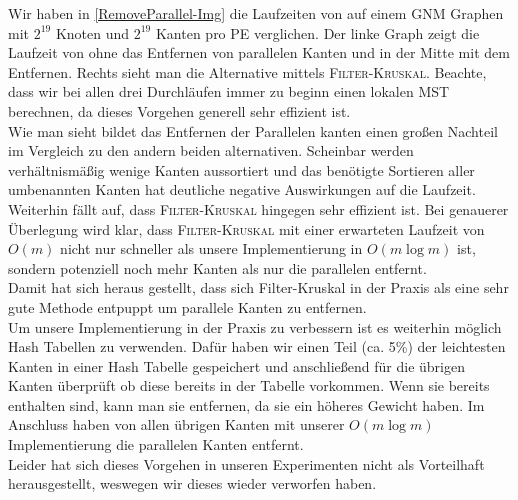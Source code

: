Wir haben in \cref{RemoveParallel-Img} die Laufzeiten von \boruvkaAllreduce auf einem GNM Graphen mit $2^{19}$ Knoten und $2^{19}$ Kanten pro PE verglichen. Der linke Graph zeigt die Laufzeit von \boruvkaAllreduce ohne das Entfernen von parallelen Kanten und in der Mitte mit dem Entfernen. Rechts sieht man die Alternative mittels \textsc{Filter-Kruskal}. Beachte, dass wir bei allen drei Durchläufen immer zu beginn einen lokalen MST berechnen, da dieses Vorgehen generell sehr effizient ist.\\
Wie man sieht bildet das Entfernen der Parallelen kanten einen großen Nachteil im Vergleich zu den andern beiden alternativen. Scheinbar werden verhältnismäßig wenige Kanten aussortiert und das benötigte Sortieren aller umbenannten Kanten hat deutliche negative Auswirkungen auf die Laufzeit.\\
Weiterhin fällt auf, dass \textsc{Filter-Kruskal} hingegen sehr effizient ist. Bei genauerer Überlegung wird klar, dass \textsc{Filter-Kruskal} mit einer erwarteten Laufzeit von $O(m)$ nicht nur schneller als unsere Implementierung in $O(m \log m)$ ist, sondern potenziell noch mehr Kanten als nur die parallelen entfernt. \\
Damit hat sich heraus gestellt, dass sich Filter-Kruskal in der Praxis als eine sehr gute Methode entpuppt um parallele Kanten zu entfernen.\\
Um unsere Implementierung in der Praxis zu verbessern ist es weiterhin möglich Hash Tabellen zu verwenden. Dafür haben wir einen Teil (ca. 5\%) der leichtesten Kanten in einer Hash Tabelle gespeichert und anschließend für die übrigen Kanten überprüft ob diese bereits in der Tabelle vorkommen. Wenn sie bereits enthalten sind, kann man sie entfernen, da sie ein höheres Gewicht haben. Im Anschluss haben von allen übrigen Kanten mit unserer $O(m \log m)$ Implementierung die parallelen Kanten entfernt. \\
Leider hat sich dieses Vorgehen in unseren Experimenten nicht als Vorteilhaft herausgestellt, weswegen wir dieses wieder verworfen haben.





